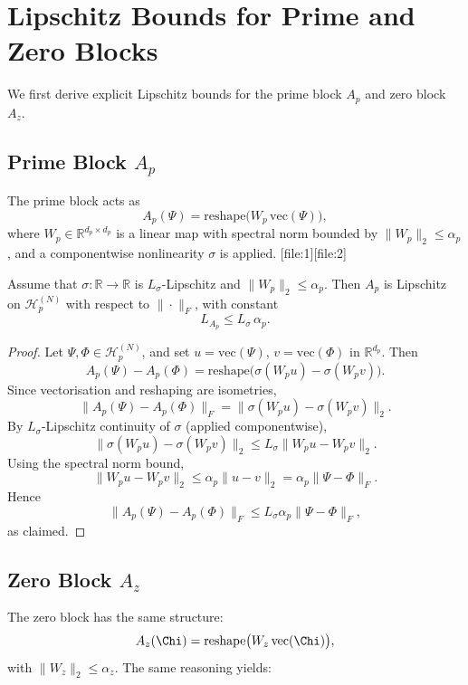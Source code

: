 \documentclass[11pt]{article}
\begin{document}
\section{Lipschitz Bounds for Prime and Zero Blocks}

We first derive explicit Lipschitz bounds for the prime block $A_p$ and
zero block $A_z$.

\subsection{Prime Block $A_p$}

The prime block acts as
\[
  A_p(\Psi) = \mathrm{reshape}\bigl(W_p \,\mathrm{vec}(\Psi)\bigr),
\]
where $W_p \in \mathbb{R}^{d_p \times d_p}$ is a linear map with
spectral norm bounded by $\|W_p\|_2 \le \alpha_p$, and a componentwise
nonlinearity $\sigma$ is applied.%
[file:1][file:2]

\begin{lemma}
Assume that $\sigma:\mathbb{R}\to\mathbb{R}$ is $L_\sigma$-Lipschitz and
$\|W_p\|_2 \le \alpha_p$. Then $A_p$ is Lipschitz on
$\mathcal{H}_{p}^{(N)}$ with respect to $\|\cdot\|_F$, with constant
\[
  L_{A_p} \le L_\sigma \, \alpha_p.
\]
\end{lemma}

\begin{proof}
Let $\Psi,\Phi \in \mathcal{H}_{p}^{(N)}$, and set
$u = \mathrm{vec}(\Psi)$, $v = \mathrm{vec}(\Phi)$ in $\mathbb{R}^{d_p}$.
Then
\[
  A_p(\Psi) - A_p(\Phi)
  = \mathrm{reshape}\bigl( \sigma(W_p u) - \sigma(W_p v) \bigr).
\]
Since vectorisation and reshaping are isometries,
\[
  \|A_p(\Psi) - A_p(\Phi)\|_F
  = \|\sigma(W_p u) - \sigma(W_p v)\|_2.
\]
By $L_\sigma$-Lipschitz continuity of $\sigma$ (applied componentwise),
\[
  \|\sigma(W_p u) - \sigma(W_p v)\|_2
  \le L_\sigma \|W_p u - W_p v\|_2.
\]
Using the spectral norm bound,
\[
  \|W_p u - W_p v\|_2 \le \alpha_p \|u - v\|_2
  = \alpha_p \|\Psi - \Phi\|_F.
\]
Hence
\[
  \|A_p(\Psi) - A_p(\Phi)\|_F
  \le L_\sigma \alpha_p \|\Psi - \Phi\|_F,
\]
as claimed.
\end{proof}

\subsection{Zero Block $A_z$}

The zero block has the same structure:
\[
  A_z(\Chi) = \mathrm{reshape}\bigl(W_z \,\mathrm{vec}(\Chi)\bigr),
\]
with $\|W_z\|_2 \le \alpha_z$. The same reasoning yields:
\end{document}
